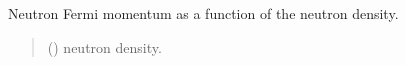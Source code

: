 \documentclass[letterpaper,10pt,english]{sphinxmanual}
\begin{document}
\begin{fulllineitems}
\label{\detokenize{source/api/setup_eos_ffg:nucleardatapy.eos.setup_ffg.kf_n}}
\pysigstartsignatures
{}
\pysigstopsignatures
\sphinxAtStartPar
Neutron Fermi momentum as a function of the neutron density.
\begin{quote}\begin{description}
\sphinxAtStartPar
{} () \textendash{} neutron density.

\end{description}\end{quote}

\end{fulllineitems}

\end{document}
